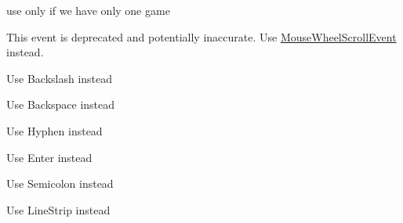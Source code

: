 
\begin{DoxyRefList}
\item[Member \mbox{\hyperlink{class_handle_uuid_a7f1e645ad23622b0c7f18f30ee939d76}{Handle\+Uuid$<$ Data\+Type $>$\+::\+\_\+\+\_\+\+Get\+Uuid\+Of\+Fist\+Lobby}} (uuid\+\_\+t \&Lobby\+Uuid)]\label{deprecated__deprecated000024}%
%
use only if we have only one game  
\item[Class \mbox{\hyperlink{structsf_1_1_event_1_1_mouse_wheel_event}{sf\+::Event\+::Mouse\+Wheel\+Event}} ]\label{deprecated__deprecated000018}%
%
This event is deprecated and potentially inaccurate. Use \mbox{\hyperlink{structsf_1_1_event_1_1_mouse_wheel_scroll_event}{Mouse\+Wheel\+Scroll\+Event}} instead. 
\item[Member \mbox{\hyperlink{classsf_1_1_keyboard_acb4cacd7cc5802dec45724cf3314a142a536df84e73859aa44e11e192459470b6}{sf\+::Keyboard\+::Back\+Slash}} ]\label{deprecated__deprecated000021}%
%
Use Backslash instead  
\item[Member \mbox{\hyperlink{classsf_1_1_keyboard_acb4cacd7cc5802dec45724cf3314a142a33aeaab900abcd01eebf2fcc4f6d97e2}{sf\+::Keyboard\+::Back\+Space}} ]\label{deprecated__deprecated000020}%
%
Use Backspace instead  
\item[Member \mbox{\hyperlink{classsf_1_1_keyboard_acb4cacd7cc5802dec45724cf3314a142a401a183dcfde0a06cb60fe6c91fa1e39}{sf\+::Keyboard\+::Dash}} ]\label{deprecated__deprecated000019}%
%
Use Hyphen instead  
\item[Member \mbox{\hyperlink{classsf_1_1_keyboard_acb4cacd7cc5802dec45724cf3314a142ac291de81bdee518d636bc359f2ca77de}{sf\+::Keyboard\+::Return}} ]\label{deprecated__deprecated000023}%
%
Use Enter instead  
\item[Member \mbox{\hyperlink{classsf_1_1_keyboard_acb4cacd7cc5802dec45724cf3314a142a460ab09a36f9ed230504b89b9815de88}{sf\+::Keyboard\+::Semi\+Colon}} ]\label{deprecated__deprecated000022}%
%
Use Semicolon instead  
\item[Member \mbox{\hyperlink{group__graphics_gga5ee56ac1339984909610713096283b1ba5b09910f5d0f39641342184ccd0d1de3}{sf\+::Lines\+Strip}} ]\label{deprecated__deprecated000001}%
%
Use Line\+Strip instead  
\item[Member \mbox{\hyperlink{classsf_1_1_render_texture_aaec1fb8ee77844da50b0143cb41c8a71}{sf\+::Render\+Texture\+::create}} (unsigned int width, unsigned int height, bool depth\+Buffer)]\label{deprecated__deprecated000004}%

\end{DoxyRefList}
